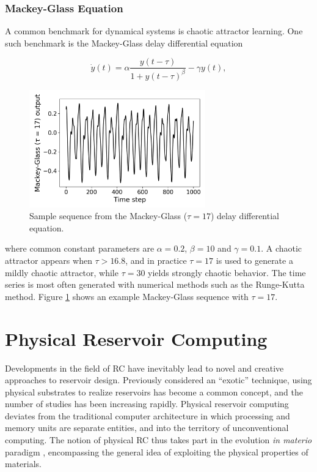 \subsubsection{Mackey-Glass Equation}


A common benchmark for dynamical systems is chaotic attractor learning. One such
benchmark is the Mackey-Glass delay differential equation

\begin{equation}
  \dot{y}(t) =
    \alpha \frac
    {y(t-\tau)}
    {1 + y(t-\tau)^\beta}
    - \gamma y(t),
  \label{eq:mg17}
\end{equation}

\begin{figure}[t!]
  \centering
  \includegraphics[width=3.0in]{figures/mg17-example.png}
  \caption{
    Sample sequence from the Mackey-Glass ($\tau = 17$) delay differential
equation.
  }
  \label{fig:mg17-example}
\end{figure}

where common constant parameters are $\alpha = 0.2$, $\beta = 10$ and $\gamma =
0.1$. A chaotic attractor appears when $\tau > 16.8$, and in practice $\tau =
17$ is used to generate a mildly chaotic attractor, while $\tau = 30$ yields
strongly chaotic behavior. The time series is most often generated with
numerical methods such as the Runge-Kutta method. Figure \ref{fig:mg17-example}
shows an example Mackey-Glass sequence with $\tau = 17$.

\section{Physical Reservoir Computing}
\label{sec:prc}

Developments in the field of RC have inevitably lead to novel and creative
approaches to reservoir design. Previously considered an ``exotic'' technique,
using physical substrates to realize reservoirs has become a common concept, and
the number of studies has been increasing rapidly. Physical reservoir computing
deviates from the traditional computer architecture in which processing and
memory units are separate entities, and into the territory of unconventional
computing. The notion of physical RC thus takes part in the evolution \textit{in
materio} paradigm \cite{miller_evolution_2002}, encompassing the general idea of
exploiting the physical properties of materials.

